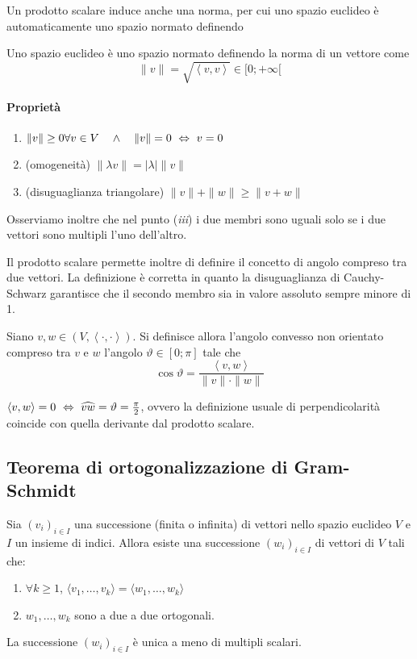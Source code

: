 \documentclass{article}     %
\newcommand{\scp}[1][\cdot,\cdot]{\left\langle #1 \right\rangle}
\begin{document}
Un prodotto scalare induce anche una norma, per cui uno spazio euclideo è automaticamente uno spazio normato definendo

\begin{boxdef}[Norma]
    Uno spazio euclideo è uno spazio normato definendo la norma di un vettore come 
    \[\|v\|=\sqrt{\scp[v,v]}\in [0;+\infty[\]
\end{boxdef}
\paragraph{Proprietà}
\begin{enumerate}[label=$\roman*)$]
    \item $\|v\|\geq 0\forall v \in V \quad \land \quad \|v\|=0\ \Leftrightarrow\ v=0$
    \item (omogeneità) $\|\lambda v\|=|\lambda|\|v\|$
    \item (disuguaglianza triangolare) $\|v\|+\|w\|\geq \|v+w\|$
\end{enumerate}
Osserviamo inoltre che nel punto (\textit{iii}) i due membri sono uguali solo se i due vettori sono multipli l'uno dell'altro.

Il prodotto scalare permette inoltre di definire il concetto di angolo compreso tra due vettori. La definizione è corretta in quanto la disuguaglianza di Cauchy-Schwarz garantisce che il secondo membro sia in valore assoluto sempre minore di 1.
\begin{boxdef}
    Siano $v,w \in (V,\scp)$. Si definisce allora l'angolo convesso non orientato compreso tra $v$ e $w$ l'angolo $\vartheta\in [0;\pi]$ tale che 
    \[\cos \vartheta = \frac{\scp[v,w]}{\|v\|\cdot \|w\|}\]
\end{boxdef}
\begin{oss}
    $\scp[v,w]=0\ \Harr \ \widehat{vw}=\vartheta = \frac{\pi}{2}$, ovvero la definizione usuale di perpendicolarità coincide con quella derivante dal prodotto scalare.
\end{oss}
\subsection{Teorema di ortogonalizzazione di Gram-Schmidt}

\begin{shadedTheorem}
    Sia $(v_i)_{i\in I}$ una successione (finita o infinita) di vettori nello spazio euclideo $V$ e $I$ un insieme di indici. Allora esiste una successione $(w_i)_{i\in I}$ di vettori di $V$ tali che:
    \begin{enumerate}[label=$\roman*)$]
        \item $\forall k\geq 1$, $\langle v_1, \dots, v_k\rangle= \langle w_1, \dots, w_k\rangle$
        \item $w_1, \dots, w_k$ sono a due a due ortogonali.
    \end{enumerate}
    La successione $(w_i)_{i\in I}$ è unica a meno di multipli scalari.
\end{shadedTheorem}
\end{document}

